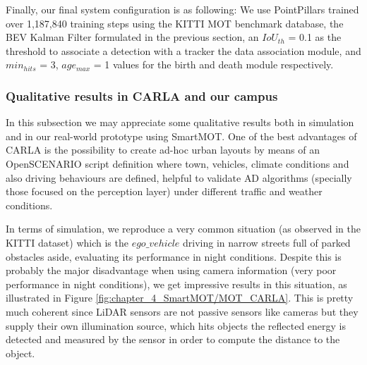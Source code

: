 Finally, our final system configuration is as following: We use PointPillars trained over 1,187,840 training steps using the KITTI MOT benchmark database, the BEV Kalman Filter formulated in the previous section, an $IoU_{th}$ = 0.1 as the threshold to associate a detection with a tracker the data association module, and $min_{hits}$ = 3, $age_{max}$ = 1 values for the birth and death module respectively. 

\subsubsection{Qualitative results in CARLA and our campus}
\label{subsubsubsec:4_mot_quali_carla_campus}

In this subsection we may appreciate some qualitative results both in simulation and in our real-world prototype using SmartMOT. One of the best advantages of CARLA is the possibility to create ad-hoc urban layouts by means of an OpenSCENARIO \cite{jullien2009openscenario} script definition where town, vehicles, climate conditions and also driving behaviours are defined, helpful to validate \ac{AD} algorithms (specially those focused on the perception layer) under different traffic and weather conditions. 

In terms of simulation, we reproduce a very common situation (as observed in the KITTI dataset) which is the $ego\_vehicle$ driving in narrow streets full of parked obstacles aside, evaluating its performance in night conditions. Despite this is probably the major disadvantage when using camera information (very poor performance in night conditions), we get impressive results in this situation, as illustrated in Figure \ref{fig:chapter_4_SmartMOT/MOT_CARLA}. This is pretty much coherent since LiDAR sensors are not passive sensors like cameras but they supply their own illumination source, which hits objects the reflected energy is detected and measured by the sensor in order to compute the distance to the object.

